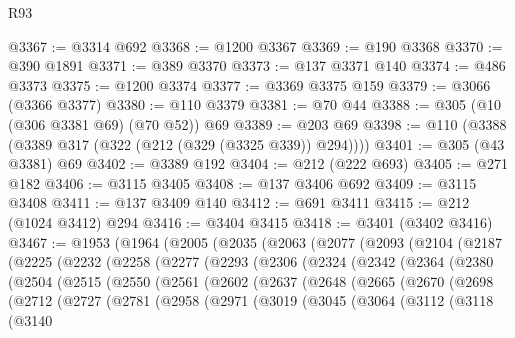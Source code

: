\begin{lexlean}{R93}
\begin{coremodule}
@3367 := @3314 @692
@3368 := @1200 @3367
@3369 := @190 @3368
@3370 := @390 @1891
@3371 := @389 @3370
@3373 := @137 @3371 @140
@3374 := @486 @3373
@3375 := @1200 @3374
@3377 := @3369 @3375 @159
@3379 := @3066 (@3366 @3377)
@3380 := @110 @3379
@3381 := @70 @44
@3388 := @305 (@10 (@306 @3381 @69) (@70 @52)) @69
@3389 := @203 @69
@3398 := @110 (@3388 (@3389 @317 (@322 (@212 (@329 (@3325 @339)) @294))))
@3401 := @305 (@43 @3381) @69
@3402 := @3389 @192
@3404 := @212 (@222 @693)
@3405 := @271 @182
@3406 := @3115 @3405
@3408 := @137 @3406 @692
@3409 := @3115 @3408
@3411 := @137 @3409 @140
@3412 := @691 @3411
@3415 := @212 (@1024 @3412) @294
@3416 := @3404 @3415
@3418 := @3401 (@3402 @3416)
@3467 := @1953
    (@1964
      (@2005
        (@2035
          (@2063
            (@2077
              (@2093
                (@2104
                  (@2187
                    (@2225
                      (@2232
                        (@2258
                          (@2277
                            (@2293
                              (@2306
                                (@2324
                                  (@2342
                                    (@2364
                                      (@2380
                                        (@2504
                                          (@2515
                                            (@2550
                                              (@2561
                                                (@2602
                                                  (@2637
                                                    (@2648
                                                      (@2665
                                                        (@2670
                                                          (@2698
                                                            (@2712
                                                              (@2727
                                                                (@2781
                                                                  (@2958
                                                                    (@2971
                                                                      (@3019
                                                                        (@3045
                                                                          (@3064
                                                                            (@3112
                                                                              (@3118
                                                                                (@3140

\end{coremodule}
\end{lexlean}
